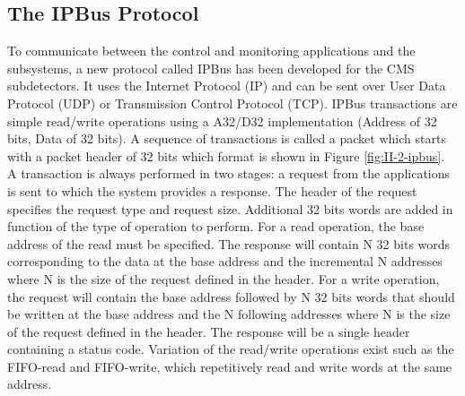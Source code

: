     \subsection{The IPBus Protocol}
    \label{sec:II-2-ipbus}

      To communicate between the control and monitoring applications and the subsystems, a new protocol called IPBus has been developed for the CMS subdetectors. It uses the Internet Protocol (IP) and can be sent over User Data Protocol (UDP) or Transmission Control Protocol (TCP). IPBus transactions are simple read/write operations using a A32/D32 implementation (Address of 32 bits, Data of 32 bits). A sequence of transactions is called a packet which starts with a packet header of 32 bits which format is shown in Figure \ref{fig:II-2-ipbus}. \\

      A transaction is always performed in two stages: a request from the applications is sent to which the system provides a response. The header of the request specifies the request type and request size. Additional 32 bits words are added in function of the type of operation to perform. For a read operation, the base address of the read must be specified. The response will contain N 32 bits words corresponding to the data at the base address and the incremental N addresses where N is the size of the request defined in the header. For a write operation, the request will contain the base address followed by N 32 bits words that should be written at the base address and the N following addresses where N is the size of the request defined in the header. The response will be a single header containing a status code. Variation of the read/write operations exist such as the FIFO-read and FIFO-write, which repetitively read and write words at the same address. \\

